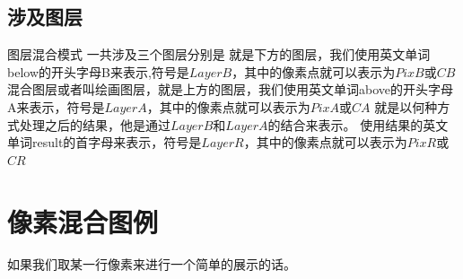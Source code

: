 \subsection{涉及图层}
\indent 图层混合模式 一共涉及三个图层分别是   \newline 
{}\newline 
\indent 就是下方的图层，我们使用英文单词below的开头字母B来表示,符号是$LayerB$，其中的像素点就可以表示为$PixB$或$CB$ \newline 
{}\newline 
\indent 混合图层或者叫绘画图层，就是上方的图层，我们使用英文单词above的开头字母A来表示，符号是$LayerA$，其中的像素点就可以表示为$PixA$或$CA$ \newline 
{} \newline 
\indent 就是以何种方式处理之后的结果，他是通过$LayerB$和$LayerA$的结合来表示。 使用结果的英文单词result的首字母来表示，符号是$LayerR$，其中的像素点就可以表示为$PixR$或$CR$
\section{像素混合图例}

如果我们取某一行像素来进行一个简单的展示的话。

